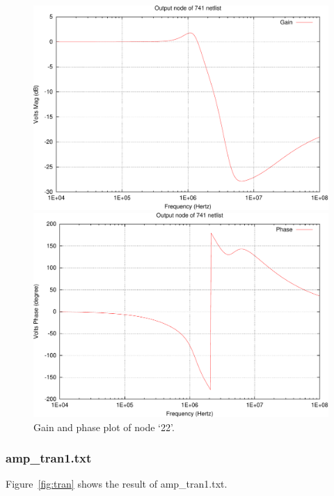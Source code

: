 \documentclass[12pt]{article}
\begin{document}
\begin{figure}[htbp]
  \centering
    \includegraphics[width=.8\textwidth]{741_amplifier_22_g-crop.pdf}

    \vspace{2em}

    \includegraphics[width=.8\textwidth]{741_amplifier_22_p-crop.pdf}
  \caption{Gain and phase plot of node `22'.}
  \label{fig:741}
\end{figure}

\subsubsection{amp\_tran1.txt}
Figure~\ref{fig:tran} shows the result of amp\_tran1.txt.
\end{document}
